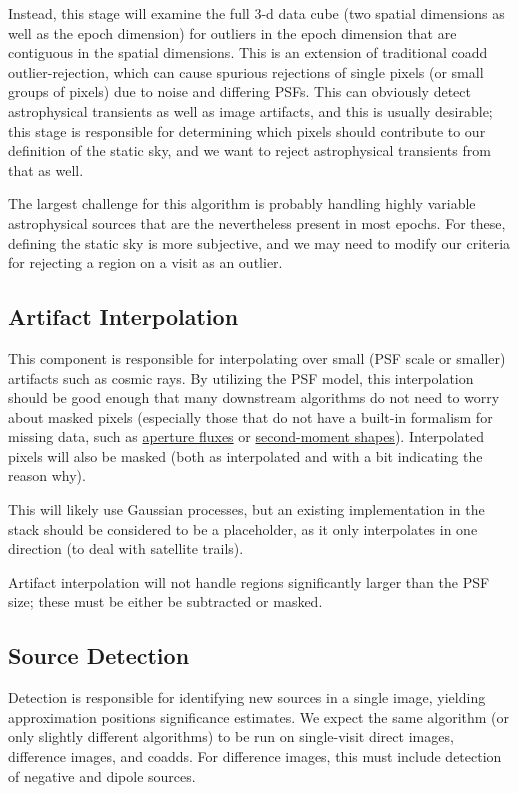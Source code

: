 Instead, this stage will examine the full 3-d data cube (two spatial dimensions as well as the epoch dimension) for outliers in the epoch dimension that are contiguous in the spatial dimensions.  This is an extension of traditional coadd outlier-rejection, which can cause spurious rejections of single pixels (or small groups of pixels) due to noise and differing PSFs.  This can obviously detect astrophysical transients as well as image artifacts, and this is usually desirable; this stage is responsible for determining which pixels should contribute to our definition of the static sky, and we want to reject astrophysical transients from that as well.

The largest challenge for this algorithm is probably handling highly variable astrophysical sources that are the nevertheless present in most epochs.  For these, defining the static sky is more subjective, and we may need to modify our criteria for rejecting a region on a visit as an outlier.


\subsection{Artifact Interpolation}
\label{sec:acArtifactInterpolation}

This component is responsible for interpolating over small (PSF scale or smaller) artifacts such as cosmic rays.  By utilizing the PSF model, this interpolation should be good enough that many downstream algorithms do not need to worry about masked pixels (especially those that do not have a built-in formalism for missing data, such as \hyperref[sec:acAperturePhotometry]{aperture fluxes} or \hyperref[sec:acShapeAlgorithms]{second-moment shapes}).  Interpolated pixels will also be masked (both as interpolated and with a bit indicating the reason why).

This will likely use Gaussian processes, but an existing implementation in the stack should be considered to be a placeholder, as it only interpolates in one direction (to deal with satellite trails).

Artifact interpolation will not handle regions significantly larger than the PSF size; these must be either be subtracted or masked.


\subsection{Source Detection}
\label{sec:acSourceDetection}

Detection is responsible for identifying new sources in a single image, yielding approximation positions significance estimates.  We expect the same algorithm (or only slightly different algorithms) to be run on single-visit direct images, difference images, and coadds.  For difference images, this must include detection of negative and dipole sources.

